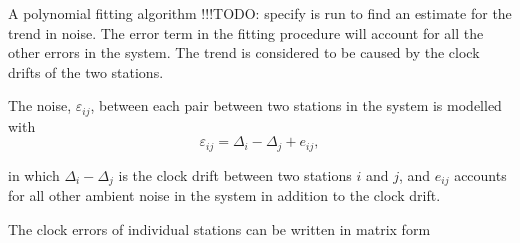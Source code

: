 \documentclass[12pt,a4paper,english]{article}
\newcommand\todo[1]{{\color{red}!!!TODO: #1}}
\begin{document}
A polynomial fitting algorithm \todo{specify} is run to find an estimate for the trend in noise. The error term in the fitting procedure will account for all the other errors in the system. The trend is considered to be caused by the clock drifts of the two stations. 

The noise, $\varepsilon_{ij}$, between each pair between two stations in the system is modelled with 
\begin{equation}
\varepsilon_{ij} =  \Delta_i - \Delta_j  + e_{ij},
\end{equation}

in which $ \Delta_i - \Delta_j $ is the clock drift between two stations $i$ and $j$, and $e_{ij}$ accounts for all other ambient noise in the system in addition to the clock drift. 

The clock errors of individual stations can be written in matrix form 
\end{document}
